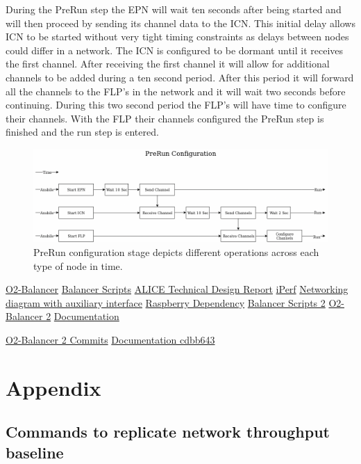 \documentclass[]{article}
\begin{document}
During the PreRun step the EPN will wait ten seconds after being started and will then proceed by sending its channel data to the ICN. This initial delay allows ICN to be started without very tight timing constraints as delays between nodes could differ in a network. The ICN is configured to be dormant until it receives the first channel. After receiving the first channel it will allow for additional channels to be added during a ten second period. After this period it will forward all the channels to the FLP’s in the network and it will wait two seconds before continuing. During this two second period the FLP’s will have time to configure their channels. With the FLP their channels configured the PreRun step is finished and the run step is entered.

\begin{center}
	\begin{figure}[H]
		\includegraphics[width=\textwidth]{no-zookeeper-flow}
		\caption{PreRun configuration stage depicts different operations across each type of node in time.}
		\label{fig:ssh}
	\end{figure}
\end{center}




\printnoidxglossary[type=\acronymtype]


\begin{thebibliography}{}
	\label{sec:ref01}\bibitem{}\href{https://github.com/hexoxide/O2-Balancer}{O2-Balancer}
	\label{sec:ref02}\bibitem{}\href{https://github.com/valvy/BalancerScripts}{Balancer Scripts}
	\label{sec:ref03}\bibitem{}\href{http://cds.cern.ch/record/2011297/files/ALICE-TDR-019.pdf?version=3}{ALICE Technical Design Report}
	\label{sec:ref04}\bibitem{}\href{https://iperf.fr/}{iPerf}
	\label{sec:ref05}\bibitem{}\href{https://github.com/hexoxide/documentation/blob/master/draw-io/Network-Primary-Auxillary-Dec-14.png}{Networking diagram with auxiliary interface}
	\label{sec:ref06}\bibitem{}\href{https://github.com/hexoxide/raspberry-dependency}{Raspberry Dependency}
	\label{sec:ref07}\bibitem{}\href{https://github.com/hexoxide/BalancerScripts2}{Balancer Scripts 2}
	\label{sec:ref08}\bibitem{}\href{https://github.com/hexoxide/O2-Balancer2}{O2-Balancer 2}
	\label{sec:ref09}\bibitem{}\href{https://github.com/hexoxide/documentation}{Documentation}
	
	\label{sec:ref10}\bibitem{}\href{https://github.com/hexoxide/O2-Balancer2/commits/experiment-1}{O2-Balancer 2 Commits}
	\label{sec:ref11}\bibitem{}\href{https://github.com/hexoxide/documentation/tree/cdbb643c6ebc875e73e8c1c2433c6d14cda05aca}{Documentation cdbb643}
\end{thebibliography}


\section{Appendix}
\label{sec:appendix}
\subsection{Commands to replicate network throughput baseline}
\end{document}
